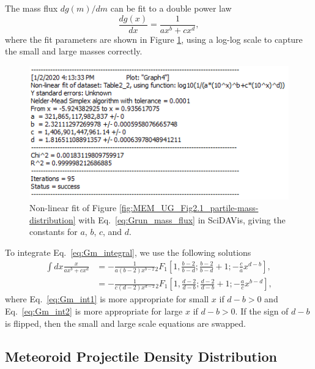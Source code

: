 \documentclass{hitec}
\numberwithin{equation}{section}
\begin{document}
The mass flux $dg(m)/dm$ can be fit to a double power law
\begin{equation}\label{eq:Grun_mass_flux}
\frac{dg(x)}{dx} = \frac{1}{ax^b+cx^d},
\end{equation}
where the fit parameters are shown in Figure \ref{fig:Fit-to-D_Grun}, using a log-log scale to capture the small and large masses correctly.

\begin{figure}[h!]
	\centering
	\includegraphics[scale=1]{Fit-to-D_Grun.PNG}
	\caption{Non-linear fit of Figure \ref{fig:MEM_UG_Fig2.1_partile-mass-distribution} with Eq.\ \ref{eq:Grun_mass_flux} in \textsf{SciDAVis}, giving the constants for $a$, $b$, $c$, and $d$.}\label{fig:Fit-to-D_Grun}
\end{figure}

To integrate Eq.\ \eqref{eq:Gm_integral}, we use the following solutions
\begin{align}\label{eq:Gm_int1}
\int dx\frac{x}{ax^b+cx^d} &= -\frac{1}{a(b-2)x^{b-2}} {}_2F_1\left[1, \frac{b-2}{b-d}; \frac{b-2}{b-d}+1; -\frac{c}{a}x^{d-b}\right],\\\label{eq:Gm_int2}
&= -\frac{1}{c(d-2)x^{d-2}} {}_2F_1\left[1, \frac{d-2}{d-b}; \frac{d-2}{d-b}+1; -\frac{a}{c}x^{b-d}\right],
\end{align}
where Eq.\ \ref{eq:Gm_int1} is more appropriate for small $x$ if $d-b > 0$ and Eq.\ \ref{eq:Gm_int2} is more appropriate for large $x$ if $d-b > 0$. If the sign of $d-b$ is flipped, then the small and large scale equations are swapped.


\subsection{Meteoroid Projectile Density Distribution}
\end{document}
